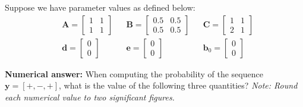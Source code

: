 \documentclass[11pt,addpoints,answers]{exam}
\numberwithin{equation}{section} %
\numberwithin{figure}{section} %
\numberwithin{table}{section} %
\newcommand{\bv}{\mathbf{b}}
\newcommand{\dv}{\mathbf{d}}
\newcommand{\ev}{\mathbf{e}}
\newcommand{\yv}{\mathbf{y}}
\newcommand{\Av}{\mathbf{A}}
\newcommand{\Bv}{\mathbf{B}}
\newcommand{\Cv}{\mathbf{C}}
\begin{document}
\begin{questions}
\begin{EnvFullwidth}
Suppose we have parameter values as defined below:
\begin{align}
& \Av = \begin{bmatrix} 1 & 1 \\ 1 & 1 \end{bmatrix} 
&& \Bv = \begin{bmatrix} 0.5 & 0.5 \\ 0.5 & 0.5 \end{bmatrix} 
&& \Cv = \begin{bmatrix} 1 & 1 \\ 2 & 1 \end{bmatrix} \\
& \dv = \begin{bmatrix} 0 \\ 0 \end{bmatrix} 
&& \ev = \begin{bmatrix} 0 \\ 0 \end{bmatrix} 
&& \bv_0 = \begin{bmatrix} 0 \\ 0 \end{bmatrix} 
\end{align}

\end{EnvFullwidth}
    

\question \textbf{Numerical answer:} When computing the probability of the sequence $\yv = [+, -, +]$, what is the value of the following three quantities? \emph{Note: Round each numerical value to two significant figures.}
    

\end{questions}
\end{document}
